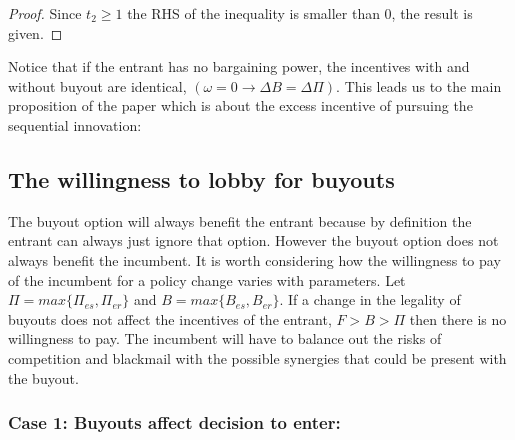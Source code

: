 \begin{proof}
Since $t_2 \geq 1$ the RHS of the inequality is smaller than 0, the result is given. 
\end{proof}

Notice that if the entrant has no bargaining power, the incentives with and without buyout are identical, $(\omega=0 \rightarrow \Delta B = \Delta \Pi)$. This leads us to the main proposition of the paper which is about the excess incentive of pursuing the sequential innovation:


\subsection{The willingness to lobby for buyouts}

The buyout option will always benefit the entrant because by definition the entrant can always just ignore that option. However the buyout option does not always benefit the incumbent. It is worth considering how the willingness to pay of the incumbent for a policy change varies with parameters.
Let $\Pi = max\{ \Pi_{es},\Pi_{er} \}$ and $B = max\{ B_{es},B_{er} \}$. If a change in the legality of buyouts does not affect the incentives of the entrant, $F>B>\Pi$ then there is no willingness to pay. The incumbent will have to balance out the risks of competition and blackmail with the possible synergies that could be present with the buyout.

\subsubsection{Case 1: Buyouts affect decision to enter: } \label{case:decision}

